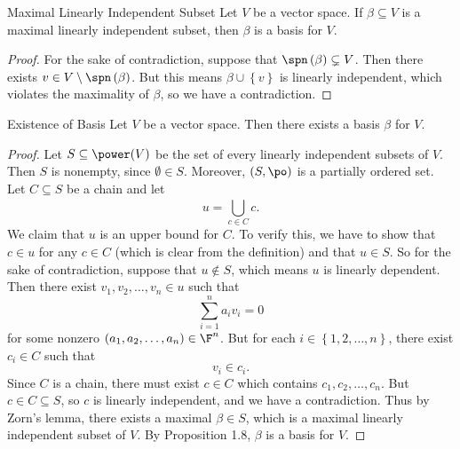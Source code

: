 \documentclass[linearalgebraI]{subfiles}
\begin{document}
    \begin{prop}{Maximal Linearly Independent Subset}
        Let $V$ be a vector space. If $\beta\subseteq V$ is a maximal linearly independent subset, then $\beta$ is a basis for $V$.
    \end{prop}

    \begin{proof}
        For the sake of contradiction, suppose that $\spn\left( \beta \right)\subsetneq V$. Then there exists $v\in V\setminus\spn\left( \beta \right)$. But this means $\beta\cup\left\lbrace v \right\rbrace$ is linearly independent, which violates the maximality of $\beta$, so we have a contradiction.
    \end{proof}

    \begin{theorem}{Existence of Basis}
        Let $V$ be a vector space. Then there exists a basis $\beta$ for $V$.
    \end{theorem}

    \begin{proof}
        Let $S\subseteq\power(V)$ be the set of every linearly independent subsets of $V$. Then $S$ is nonempty, since $\emptyset\in S$. Moreover, $\left( S,\po \right)$ is a partially ordered set. Let $C\subseteq S$ be a chain and let
        \begin{equation*}
            u = \bigcup^{}_{c\in C} c.
        \end{equation*}
        We claim that $u$ is an upper bound for $C$. To verify this, we have to show that $c\in u$ for any $c\in C$ (which is clear from the definition) and that $u\in S$. So for the sake of contradiction, suppose that $u\notin S$, which means $u$ is linearly dependent. Then there exist $v_1,v_2,\ldots,v_n\in u$ such that
        \begin{equation*}
            \sum^{n}_{i=1} a_iv_i = 0
        \end{equation*}
        for some nonzero $\left( a_1,a_2,\ldots,a_n \right) \in\F^n$. But for each $i\in\left\lbrace 1,2,\ldots,n \right\rbrace$, there exist $c_i\in C$ such that
        \begin{equation*}
            v_i\in c_i.
        \end{equation*}
        Since $C$ is a chain, there must exist $c\in C$ which contains $c_1,c_2,\ldots,c_n$. But $c\in C\subseteq S$, so $c$ is linearly independent, and we have a contradiction. Thus by Zorn's lemma, there exists a maximal $\beta\in S$, which is a maximal linearly independent subset of $V$. By Proposition 1.8, $\beta$ is a basis for $V$.
    \end{proof}
\end{document}
